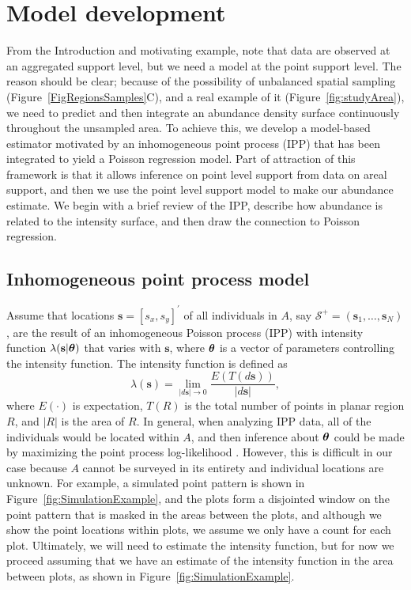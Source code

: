 \documentclass[12pt, titlepage]{article}\usepackage[]{graphicx}\usepackage[]{color}
\newcommand{\bs}{\ensuremath{\mathbf{s}}}
\newcommand{\cS}{\ensuremath{\mathcal{S}}}
\def\bs{\mathbf{s}}
\def\btheta{\mbox{\boldmath $\theta$}}
\begin{document}


\section{Model development} \label{SPPEstimator}

From the Introduction and motivating example, note that data are observed at an aggregated support level, but we need a model at the point support level. The reason should be clear; because of the possibility of unbalanced spatial sampling (Figure~\ref{FigRegionsSamples}C), and a real example of it (Figure~\ref{fig:studyArea}), we need to predict and then integrate an abundance density surface continuously throughout the unsampled area. To achieve this, we develop a model-based estimator motivated by an inhomogeneous point process (IPP) that has been integrated to yield a Poisson regression model.  Part of attraction of this framework is that it allows inference on point level support from data on areal support, and then we use the point level support model to make our abundance estimate. We begin with a brief review of the IPP, describe how abundance is related to the intensity surface, and then draw the connection to Poisson regression.



\subsection{Inhomogeneous point process model}

Assume that locations $\bs=[s_x,s_y]^\prime$ of all individuals in $A$, say $\cS^+ = (\bs_1,\dots,\bs_N)$, are the result of an inhomogeneous Poisson process (IPP) with intensity function $\lambda(\bs|\btheta)$ that varies with $\bs$, where $\btheta$ is a vector of parameters controlling the intensity function. The intensity function is defined as     
\[
\lambda(\bs) = \lim_{|d\bs| \to 0} \frac{E\left( T(d\bs) \right) }{|d\bs|},
\]
where $E(\cdot)$ is expectation, $T(R)$ is the total number of points in planar region $R$, and $|R|$ is the area of $R$. In general, when analyzing IPP data, all of the individuals would be located within $A$, and then inference about $\btheta$ could be made by maximizing the point process log-likelihood \citep*[e.g., ][p. 655]{Cres:stat:1993}. However, this is difficult in our case because $A$ cannot be surveyed in its entirety and individual locations are unknown. For example, a simulated point pattern is shown in Figure~\ref{fig:SimulationExample}, and the plots form a disjointed window on the point pattern that is masked in the areas between the plots, and although we show the point locations within plots, we assume we only have a count for each plot. Ultimately, we will need to estimate the intensity function, but for now we proceed assuming that we have an estimate of the intensity function in the area between plots, as shown in Figure~\ref{fig:SimulationExample}.      
\end{document}
